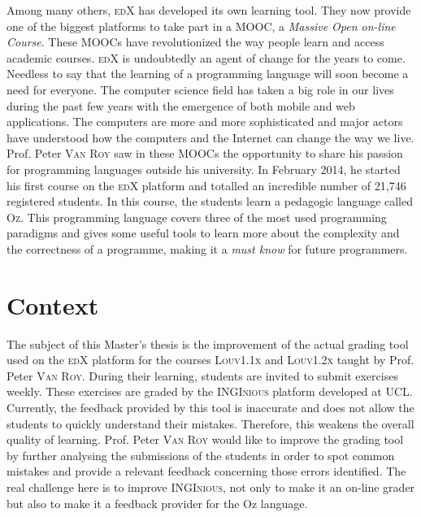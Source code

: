 \documentclass[11pt,a4paper,twoside,openright]{report}
\begin{document}
Among many others, \textsc{edX} has developed its own learning tool. They 
now provide one of the biggest platforms to take part in a MOOC, a 
\textit{Massive Open on-line Course}. These MOOCs have revolutionized the way 
people learn and access academic courses. \textsc{edX} is undoubtedly an 
agent of change for the years to come. Needless to say that the learning of a 
programming language will soon become a need for everyone. The computer science 
field has taken a big role in our lives during the past few years with the 
emergence of both mobile and web applications. The computers are more and more 
sophisticated and major actors have understood how the computers and the 
Internet can change the way we live.\\

Prof. Peter \textsc{Van Roy} saw in these MOOCs the opportunity to share his 
passion for programming languages outside his university. In February 2014, he 
started his first course on the \textsc{edX} platform and totalled an 
incredible number of 21,746 registered students. In this course, the students 
learn a pedagogic language called \textsc{Oz}. This programming language covers 
three of the most used programming paradigms and gives some useful tools to 
learn more about the complexity and the correctness of a programme, making it a 
\textit{must know} for future programmers.\\

\section{Context}

The subject of this Master's thesis is the improvement of the actual grading 
tool used on the \textsc{edX} platform for the courses \textsc{Louv1.1x} 
\cite{louv11x} and \textsc{Louv1.2x} \cite{louv12x} taught by Prof. Peter 
\textsc{Van Roy}. During their learning, students are invited to submit 
exercises weekly. These exercises are graded by the \textsc{INGInious} platform 
developed at \textsc{UCL}. Currently, the feedback provided by this tool is 
inaccurate 
and does not allow the students to quickly understand their mistakes. Therefore, 
this weakens the overall quality of learning. Prof. Peter \textsc{Van Roy} would 
like to improve the grading tool by further analysing the submissions of the 
students in order to spot common mistakes and provide a relevant feedback 
concerning those errors identified. The real challenge here is to improve 
\textsc{INGInious}, not only to make it an on-line grader but also to make 
it a feedback provider for the Oz language.
\end{document}
